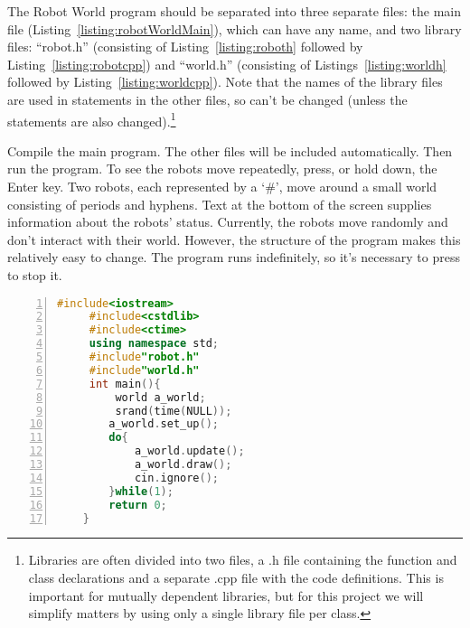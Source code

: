 The Robot World program should be separated into three separate files: the main file (Listing~\ref{listing:robotWorldMain}), which can have any name, and two library files: ``robot.h'' (consisting of Listing~\ref{listing:roboth} followed by Listing~\ref{listing:robotcpp}) and ``world.h'' (consisting of Listings~\ref{listing:worldh} followed by Listing~\ref{listing:worldcpp}).  Note that the names of the library files are used in  statements in the other files, so can't be changed (unless the  statements are also changed).\footnote{Libraries are often divided into two files, a .h file containing the function and class declarations and a separate .cpp file with the code definitions.  This is important for mutually dependent libraries, but for this project we will simplify matters by using only a single library file per class.}  

Compile the main program. The other files will be included automatically.  Then run the program.  To see the robots move repeatedly, press, or hold down, the Enter key.  Two robots, each represented by a `\#', move around a small world consisting of periods and hyphens.  Text at the bottom of the screen supplies information about the robots' status.  Currently, the robots move randomly and don't interact with their world.  However, the structure of the program makes this relatively easy to change.  The program runs indefinitely, so it's necessary to press  to stop it.

\begin{minipage}{\textwidth}
\begin{lstlisting}[language=C++,numbers = left,xleftmargin=4.0ex, basicstyle=\small, emph={a_world},emphstyle = \color{\mycolor},
showstringspaces=false,
caption = {The main program for the Robot World program.  The code to include the libraries containing the \codefont{robot} class and the \codefont{world} class is already part of the main program (lines 5 and 6).},
label={listing:robotWorldMain}]
     #include<iostream>
     #include<cstdlib>
     #include<ctime>
     using namespace std;
     #include"robot.h"
     #include"world.h"
     int main(){
         world a_world;
         srand(time(NULL));
        a_world.set_up();
        do{
            a_world.update();
            a_world.draw();
            cin.ignore();
        }while(1);
        return 0;
    }
\end{lstlisting}
\end{minipage}

